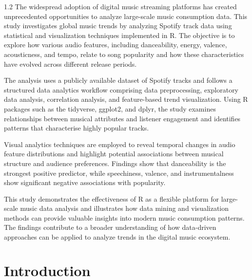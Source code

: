 \documentclass[12pt,a4paper]{article}
\begin{document}
\begin{spacing}{1.2}
\noindent
The widespread adoption of digital music streaming platforms has created unprecedented opportunities to analyze large-scale music consumption data. This study investigates global music trends by analyzing Spotify track data using statistical and visualization techniques implemented in R. The objective is to explore how various audio features, including danceability, energy, valence, acousticness, and tempo, relate to song popularity and how these characteristics have evolved across different release periods.

\vspace{0.5em}

The analysis uses a publicly available dataset of Spotify tracks and follows a structured data analytics workflow comprising data preprocessing, exploratory data analysis, correlation analysis, and feature-based trend visualization. Using R packages such as the tidyverse, ggplot2, and dplyr, the study examines relationships between musical attributes and listener engagement and identifies patterns that characterise highly popular tracks.

\vspace{0.5em}

Visual analytics techniques are employed to reveal temporal changes in audio feature distributions and highlight potential associations between musical structure and audience preferences. Findings show that danceability is the strongest positive predictor, 
while speechiness, valence, and instrumentalness show significant 
negative associations with popularity.

\vspace{0.5em}

This study demonstrates the effectiveness of R as a flexible platform for large-scale music data analysis and illustrates how data mining and visualization methods can provide valuable insights into modern music consumption patterns. The findings contribute to a broader understanding of how data-driven approaches can be applied to analyze trends in the digital music ecosystem.
\end{spacing}

\clearpage

\clearpage
\begingroup
{}
\tableofcontents
\setlength{\cftbeforesecskip}{6pt}
\endgroup
\clearpage
% 
\section{Introduction}
\end{document}
